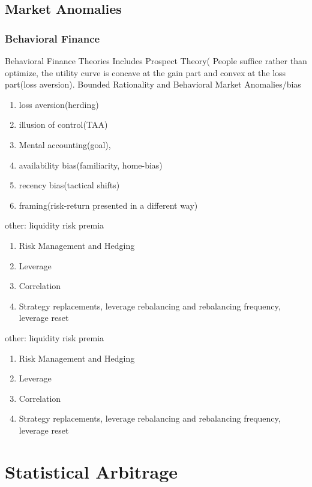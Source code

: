 \documentclass[11pt, openany]{book}              %
\begin{document}
\section{Market Anomalies}

\subsection{Behavioral Finance}

Behavioral Finance Theories Includes Prospect Theory( People suffice rather than optimize, the utility curve is concave at the gain part and convex at the loss part(loss aversion). Bounded Rationality and 
Behavioral Market Anomalies/bias

\begin{enumerate}
 \item loss aversion(herding)
 \item illusion of control(TAA) 
 \item Mental accounting(goal),
 \item availability bias(familiarity, home-bias)
 \item recency bias(tactical shifts)
 \item framing(risk-return presented in a different way)
\end{enumerate}


other: liquidity risk premia
\begin{enumerate}
 \item Risk Management and Hedging 
 \item Leverage 
 \item Correlation
 \item Strategy replacements, leverage rebalancing and rebalancing frequency, leverage reset
\end{enumerate}


other: liquidity risk premia
\begin{enumerate}
 \item Risk Management and Hedging 
 \item Leverage 
 \item Correlation
 \item Strategy replacements, leverage rebalancing and rebalancing frequency, leverage reset
\end{enumerate}

\chapter{Statistical Arbitrage}
\end{document}
